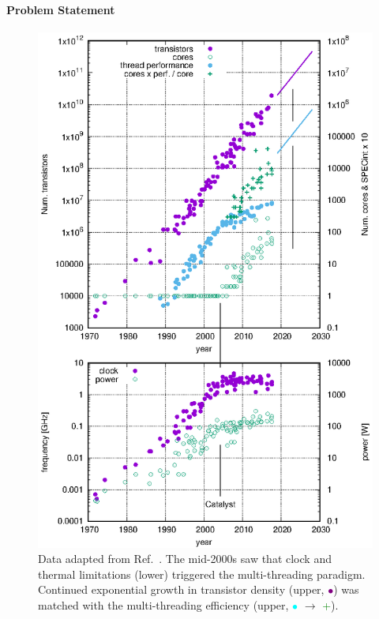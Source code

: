 \documentclass{article}
\begin{document}
\paragraph{Problem Statement}%
\begin{figure}
	\centerline{ \includegraphics[clip,trim={-2cm -2cm 1.5cm 1.5cm},width=\linewidth]{plotting_technology.eps} }
	\caption{
		\label{fig::technology} 
		Data adapted from Ref.~\cite{MicroprocessorTrendData}. The mid-2000s saw that clock and thermal limitations (lower) triggered the multi-threading paradigm.
		Continued exponential growth in transistor density (upper, \textcolor{purple}{$\bullet$}) was matched with the multi-threading efficiency (upper, \textcolor{cyan}{$\bullet$} $\rightarrow$ \textcolor{green}{+}).
	}
\end{figure}
\end{document}
